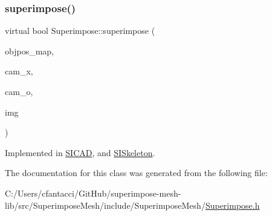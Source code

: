\subsubsection{\texorpdfstring{superimpose()}{superimpose()}}
{\footnotesize\ttfamily virtual bool Superimpose\+::superimpose (\begin{DoxyParamCaption}\item[{const \mbox{\hyperlink{classSuperimpose_a178e3d4e2def6635bfcf9454dd4b5d22}{Model\+Pose\+Container}} \&}]{objpos\+\_\+map,  }\item[{const double $\ast$}]{cam\+\_\+x,  }\item[{const double $\ast$}]{cam\+\_\+o,  }\item[{cv\+::\+Mat \&}]{img }\end{DoxyParamCaption})\hspace{0.3cm}{\ttfamily [pure virtual]}}



Implemented in \mbox{\hyperlink{classSICAD_a356e0ac8a0f130952a72326bedd4ab60}{S\+I\+C\+AD}}, and \mbox{\hyperlink{classSISkeleton_a3f49fa3419370c2597435768f280c747}{S\+I\+Skeleton}}.



The documentation for this class was generated from the following file\+:\begin{DoxyCompactItemize}
\item 
C\+:/\+Users/cfantacci/\+Git\+Hub/superimpose-\/mesh-\/lib/src/\+Superimpose\+Mesh/include/\+Superimpose\+Mesh/\mbox{\hyperlink{Superimpose_8h}{Superimpose.\+h}}\end{DoxyCompactItemize}
